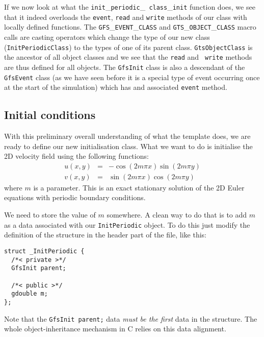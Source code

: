 \documentclass[a4paper]{article}
\begin{document}
If we now look at what the {\tt init}\_{\tt periodic}\_{\tt
class}\_{\tt init} function does, we see that it indeed overloads the
{\tt event}, {\tt read} and {\tt write} methods of our class with
locally defined functions. The {\tt GFS}\_{\tt EVENT}\_{\tt CLASS} and
{\tt GTS}\_{\tt OBJECT}\_{\tt CLASS} macro calls are casting operators
which change the type of our new class ({\tt InitPeriodicClass}) to
the types of one of its parent class. {\tt GtsObjectClass} is the
ancestor of all object classes and we see that the {\tt read} and {\tt
write} methods are thus defined for all objects. The {\tt GfsInit}
class is also a descendant of the {\tt GfsEvent} class (as we have
seen before it is a special type of event occurring once at the start
of the simulation) which has and associated {\tt event} method.

\subsection{Initial conditions}

With this preliminary overall understanding of what the template does, 
we are ready to define our new initialisation class. What we want to
do is initialise the 2D velocity field using the following functions:
\begin{eqnarray}
u(x,y) &=& - \cos(2m\pi x)\sin(2m\pi y)\\
v(x,y) &=& \sin(2m\pi x)\cos(2m\pi y)
\end{eqnarray}
where $m$ is a parameter. This is an exact stationary solution of the
2D Euler equations with periodic boundary conditions.

We need to store the value of $m$ somewhere. A clean way to do that is 
to add $m$ as a data associated with our {\tt InitPeriodic}
object. To do this just modify the definition of the structure in the
header part of the file, like this:
\begin{verbatim}
struct _InitPeriodic {
  /*< private >*/
  GfsInit parent;

  /*< public >*/
  gdouble m;
};
\end{verbatim}
Note that the {\tt GfsInit parent;} data {\em must be the first} data
in the structure. The whole object-inheritance mechanism in C relies
on this data alignment.
\end{document}
